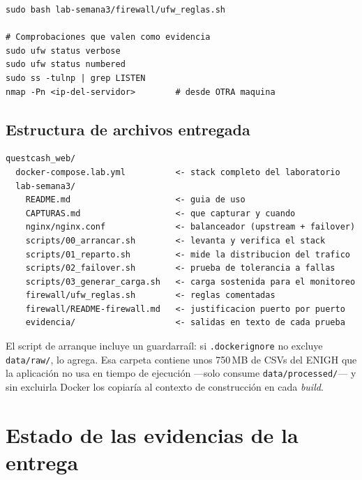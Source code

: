\documentclass[11pt,letterpaper]{article}
\begin{document}
\vspace{0.5em}
\begin{consola}[title={Firewall — ejecutar en una VM Ubuntu o VPS, no en macOS}]
\begin{lstlisting}[style=terminal]
sudo bash lab-semana3/firewall/ufw_reglas.sh

# Comprobaciones que valen como evidencia
sudo ufw status verbose
sudo ufw status numbered
sudo ss -tulnp | grep LISTEN
nmap -Pn <ip-del-servidor>        # desde OTRA maquina
\end{lstlisting}
\end{consola}

\subsection{Estructura de archivos entregada}

\begin{lstlisting}[style=terminal]
questcash_web/
  docker-compose.lab.yml          <- stack completo del laboratorio
  lab-semana3/
    README.md                     <- guia de uso
    CAPTURAS.md                   <- que capturar y cuando
    nginx/nginx.conf              <- balanceador (upstream + failover)
    scripts/00_arrancar.sh        <- levanta y verifica el stack
    scripts/01_reparto.sh         <- mide la distribucion del trafico
    scripts/02_failover.sh        <- prueba de tolerancia a fallas
    scripts/03_generar_carga.sh   <- carga sostenida para el monitoreo
    firewall/ufw_reglas.sh        <- reglas comentadas
    firewall/README-firewall.md   <- justificacion puerto por puerto
    evidencia/                    <- salidas en texto de cada prueba
\end{lstlisting}

\begin{nota}
El script de arranque incluye un guardarraíl: si \texttt{.dockerignore} no
excluye \texttt{data/raw/}, lo agrega. Esa carpeta contiene unos 750\,MB de CSVs
del ENIGH que la aplicación no usa en tiempo de ejecución —solo consume
\texttt{data/processed/}— y sin excluirla Docker los copiaría al contexto de
construcción en cada \emph{build}.
\end{nota}

\section{Estado de las evidencias de la entrega}
\end{document}
